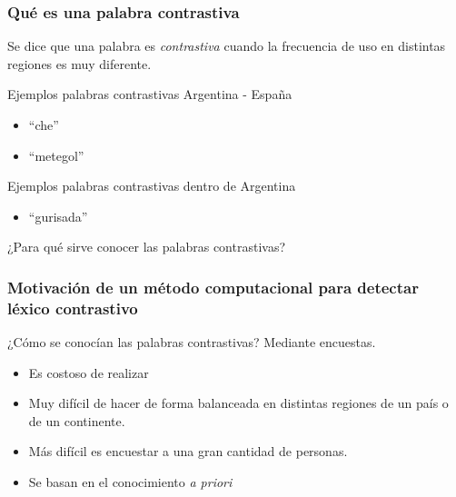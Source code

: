 
\begin{frame}[t]\frametitle{Qué es una palabra contrastiva}
    
    Se dice que una palabra es \textit{contrastiva} cuando la frecuencia de uso en distintas regiones es muy diferente. 

    \begin{block}{Ejemplos palabras contrastivas Argentina - España}
    \begin{itemize}
        \item ``che''
        \item ``metegol''
    \end{itemize}
    \end{block}

    \begin{block}{Ejemplos palabras contrastivas dentro de Argentina}
    \begin{itemize}
        \item ``gurisada''
    \end{itemize}
    \end{block}

    ¿Para qué sirve conocer las palabras contrastivas?

\end{frame}

\begin{frame}[t]\frametitle{Motivación de un método computacional para detectar léxico contrastivo}
    
    ¿Cómo se conocían las palabras contrastivas?
    Mediante encuestas.
    \begin{itemize}
        \item Es costoso de realizar
        \item Muy difícil de hacer de forma balanceada en distintas regiones de un país o de un continente.
        \item Más difícil es encuestar a una gran cantidad de personas.
        \item \alert{Se basan en el conocimiento \textit{a priori}}
    \end{itemize}
\end{frame}